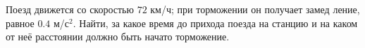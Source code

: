 Поезд движется со скоростью $72$ км/ч; при торможении он получает замед
ление, равное $0.4$ м/с$^2$. Найти, за какое время до прихода поезда на
станцию и на каком от неё расстоянии должно быть начато торможение.
